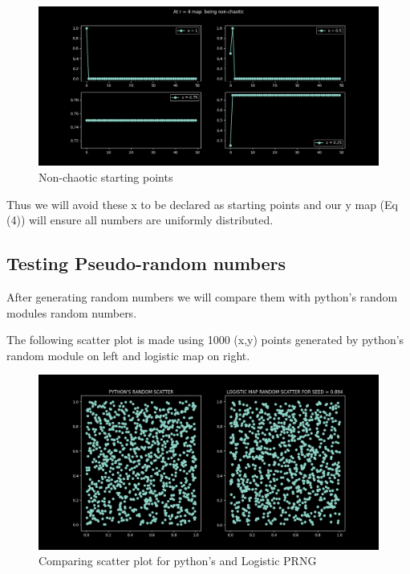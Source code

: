\documentclass{report}
\begin{document}
\begin{figure}[!h]
    \centering
    \includegraphics[scale=.45]{images/bummer.png}
    \caption{Non-chaotic starting points}
    \label{fig:my_label8}
\end{figure}

Thus we will avoid these x to be declared as starting points and our y map (Eq (4)) will ensure all numbers are uniformly distributed.
\newpage
\subsection{Testing Pseudo-random numbers}
After generating random numbers we will compare them with python's random modules random numbers.

The following scatter plot is made using 1000 (x,y) points generated by python's random module on left and logistic map on right.

\begin{figure}[!h]
    \centering
    \includegraphics[scale=.45]{images/prngscat.png}
    \caption{Comparing scatter plot for python's and Logistic PRNG}
    \label{fig:my_label9}
\end{figure}
\end{document}
